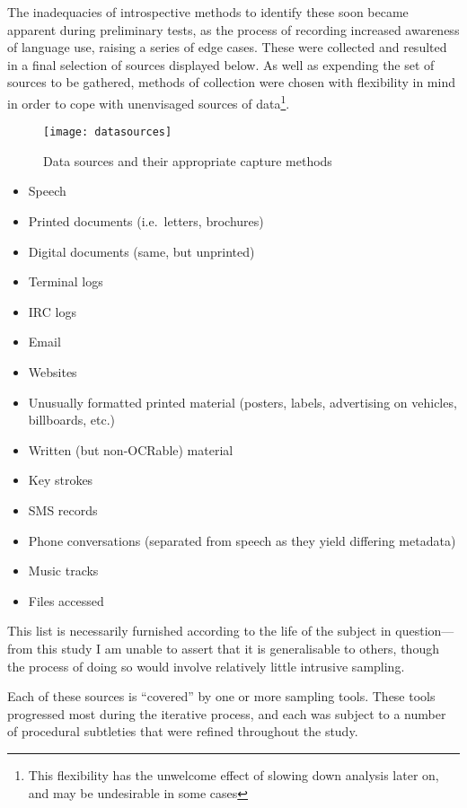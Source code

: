 The inadequacies of introspective methods to identify these soon became apparent during preliminary tests, as the process of recording increased awareness of language use, raising a series of edge cases.  These were collected and resulted in a final selection of sources displayed below.  As well as expending the set of sources to be gathered, methods of collection were chosen with flexibility in mind in order to cope with unenvisaged sources of data\footnote{This flexibility has the unwelcome effect of slowing down analysis later on, and may be undesirable in some cases}.


\begin{figure}[p]
\centering
\texttt{[image: datasources]}
\caption{Data sources and their appropriate capture methods}
\label{fig:personal:datasources}
\end{figure}



\begin{itemize}
    \item Speech
    \item Printed documents (i.e.\ letters, brochures)
    \item Digital documents (same, but unprinted)
    \item Terminal logs
    \item IRC logs
    \item Email
    \item Websites
    \item Unusually formatted printed material (posters, labels, advertising on vehicles, billboards, etc.)
    \item Written (but non-OCRable) material
    \item Key strokes
    \item SMS records
    \item Phone conversations (separated from speech as they yield differing metadata)
    \item Music tracks
    \item Files accessed
\end{itemize}

This list is necessarily furnished according to the life of the subject in question---from this study I am unable to assert that it is generalisable to others, though the process of doing so would involve relatively little intrusive sampling.

Each of these sources is ``covered'' by one or more sampling tools.  These tools progressed most during the iterative process, and each was subject to a number of procedural subtleties that were refined throughout the study.


